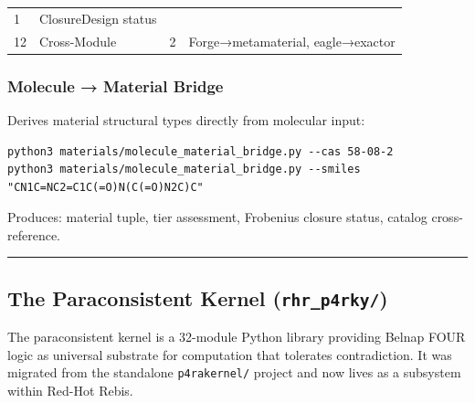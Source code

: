 \documentclass[12pt,a4paper]{article}
\begin{document}
\begin{longtable}[]{@{}llll@{}}
\begin{minipage}[t]{0.20\columnwidth}
1\strut
\end{minipage} & \begin{minipage}[t]{0.29\columnwidth}\raggedright
ClosureDesign status\strut
\end{minipage}\tabularnewline
\begin{minipage}[t]{0.09\columnwidth}\raggedright
12\strut
\end{minipage} & \begin{minipage}[t]{0.31\columnwidth}\raggedright
Cross-Module\strut
\end{minipage} & \begin{minipage}[t]{0.20\columnwidth}\raggedright
2\strut
\end{minipage} & \begin{minipage}[t]{0.29\columnwidth}\raggedright
Forge→metamaterial, eagle→exactor\strut
\end{minipage}\tabularnewline
\bottomrule
\end{longtable}

\hypertarget{molecule-material-bridge}{%
\subsubsection{Molecule → Material
Bridge}\label{molecule-material-bridge}}

Derives material structural types directly from molecular input:

\begin{verbatim}
python3 materials/molecule_material_bridge.py --cas 58-08-2
python3 materials/molecule_material_bridge.py --smiles "CN1C=NC2=C1C(=O)N(C(=O)N2C)C"
\end{verbatim}

Produces: material tuple, tier assessment, Frobenius closure status,
catalog cross-reference.

\begin{center}\rule{0.5\linewidth}{0.5pt}\end{center}

\hypertarget{the-paraconsistent-kernel-rhr_p4rky}{%
\subsection{\texorpdfstring{The Paraconsistent Kernel
(\texttt{rhr\_p4rky/})}{The Paraconsistent Kernel (rhr\_p4rky/)}}\label{the-paraconsistent-kernel-rhr_p4rky}}

The paraconsistent kernel is a 32-module Python library providing Belnap
FOUR logic as universal substrate for computation that tolerates
contradiction. It was migrated from the standalone \texttt{p4rakernel/}
project and now lives as a subsystem within Red-Hot Rebis.
\end{document}
